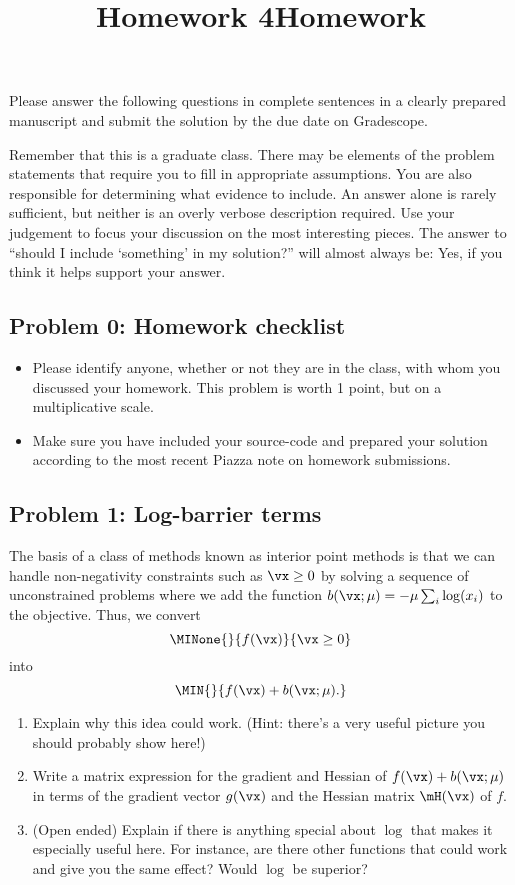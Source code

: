 \documentclass[]{article}
\title{Homework 4}
\title{Homework}
\begin{document}
\maketitle

Please answer the following questions in complete sentences in a clearly
prepared manuscript and submit the solution by the due date on
Gradescope.

Remember that this is a graduate class. There may be elements of the
problem statements that require you to fill in appropriate assumptions.
You are also responsible for determining what evidence to include. An
answer alone is rarely sufficient, but neither is an overly verbose
description required. Use your judgement to focus your discussion on the
most interesting pieces. The answer to ``should I include `something' in
my solution?'' will almost always be: Yes, if you think it helps support
your answer.

\hypertarget{problem-0-homework-checklist}{%
\subsection{Problem 0: Homework
checklist}\label{problem-0-homework-checklist}}

\begin{itemize}
\item
  Please identify anyone, whether or not they are in the class, with
  whom you discussed your homework. This problem is worth 1 point, but
  on a multiplicative scale.
\item
  Make sure you have included your source-code and prepared your
  solution according to the most recent Piazza note on homework
  submissions.
\end{itemize}

\hypertarget{problem-1-log-barrier-terms}{%
\subsection{Problem 1: Log-barrier
terms}\label{problem-1-log-barrier-terms}}

The basis of a class of methods known as interior point methods is that
we can handle non-negativity constraints such as \(\vx \ge 0\) by
solving a sequence of unconstrained problems where we add the function
\(b(\vx; \mu) = -\mu \sum_i \log(x_i)\) to the objective. Thus, we
convert \[ \MINone{}{f(\vx)}{\vx \ge 0} \] into
\[ \MIN{}{f(\vx) + b(\vx; \mu).} \]

\begin{enumerate}
\def\labelenumi{\arabic{enumi}.}
\item
  Explain why this idea could work. (Hint: there's a very useful picture
  you should probably show here!)
\item
  Write a matrix expression for the gradient and Hessian of
  \(f(\vx) + b(\vx; \mu)\) in terms of the gradient vector \(g(\vx)\)
  and the Hessian matrix \(\mH(\vx)\) of \(f\).
\item
  (Open ended) Explain if there is anything special about \(\log\) that
  makes it especially useful here. For instance, are there other
  functions that could work and give you the same effect? Would \(\log\)
  be superior?
\end{enumerate}
\end{document}
